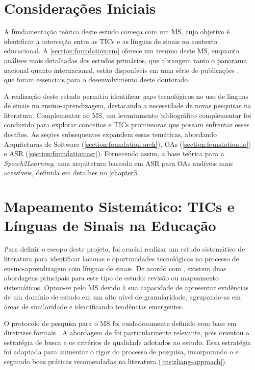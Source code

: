 \section{Considerações Iniciais}

A fundamentação teórica deste estudo começa com um MS, cujo objetivo é identificar a interseção entre as TICs e as línguas de sinais no contexto educacional. A \autoref{section:foundation:sm} oferece um resumo deste MS, enquanto análises mais detalhadas dos estudos primários, que abrangem tanto o panorama nacional quanto internacional, estão disponíveis em uma série de publicações \cite{FalvoJr2020_FIE, FalvoJr2020_SBIE, FalvoJr2021_RENOTE}, que foram essenciais para o desenvolvimento deste doutorado.

A realização deste estudo permitiu identificar \textit{gaps} tecnológicos no uso de línguas de sinais no ensino-aprendizagem, destacando a necessidade de novas pesquisas na literatura. Complementar ao MS, um levantamento bibliográfico complementar foi conduzido para explorar conceitos e TICs promissoras que possam enfrentar esses desafios. As seções subsequentes expandem essas temáticas, abordando Arquiteturas de Software (\autoref{section:foundation:arch}), OAs (\autoref{section:foundation:lo}) e ASR (\autoref{section:foundation:asr}). Fornecendo assim, a base teórica para a \textit{Speech2Learning}, uma arquitetura baseada em ASR para OAs audíveis mais acessíveis, definida em detalhes no \autoref{chapter3}.

\section{Mapeamento Sistemático: TICs e Línguas de Sinais na Educação}
\label{section:foundation:sm}

Para definir o escopo deste projeto, foi crucial realizar um estudo sistemático de literatura para identificar lacunas e oportunidades tecnológicas no processo de ensino-aprendizagem com línguas de sinais. De acordo com , existem duas abordagens principais para este tipo de estudo: revisão ou mapeamento sistemáticos. Optou-se pelo MS devido à sua capacidade de apresentar evidências de um domínio de estudo em um alto nível de granularidade, agrupando-as em áreas de similaridade e identificando tendências emergentes.

O protocolo de pesquisa para o MS foi cuidadosamente definido com base em diretrizes formais  \cite{Kitchenham2007, Nakagawa2010, Zhang2011, Petersen2015}. A abordagem de  foi particularmente relevante, pois orientou a estratégia de busca e os critérios de qualidade adotados no estudo. Essa estratégia foi adaptada para aumentar o rigor do processo de pesquisa, incorporando o  e seguindo boas práticas recomendadas na literatura (\autoref{ms:zhang-approach}).

